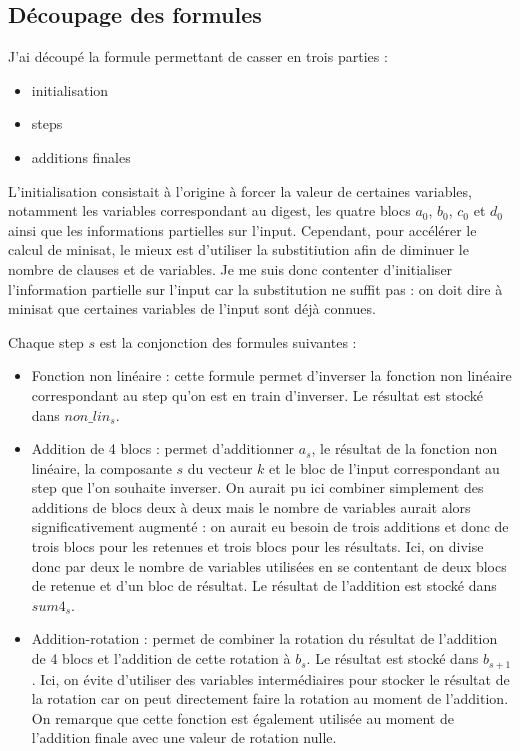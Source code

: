 \documentclass{article}
\begin{document}
\subsection{Découpage des formules}
J'ai découpé la formule permettant de casser en trois parties : 
\begin{itemize}
\item initialisation
\item steps
\item additions finales
\end{itemize}
 
L'initialisation consistait à l'origine à forcer la valeur de certaines variables, notamment les variables correspondant au digest, les quatre blocs $a_0$, $b_0$, $c_0$ et $d_0$ ainsi que les informations partielles sur l'input. Cependant, pour accélérer le calcul de minisat, le mieux est d'utiliser la substitiution afin de diminuer le nombre de clauses et de variables. Je me suis donc contenter d'initialiser l'information partielle sur l'input car la substitution ne suffit pas : on doit dire à minisat que certaines variables de l'input sont déjà connues.
\par
Chaque step $s$ est la conjonction des formules suivantes : 
\begin{itemize}
  \item Fonction non linéaire : cette formule permet d'inverser la fonction non linéaire correspondant au step qu'on est en train d'inverser. Le résultat est stocké dans $non\_lin_s$.
  \item Addition de 4 blocs : permet d'additionner $a_s$, le résultat de la fonction non linéaire, la composante $s$ du vecteur $k$ et le bloc de l'input correspondant au step que l'on souhaite inverser. On aurait pu ici combiner simplement des additions de blocs deux à deux mais le nombre de variables aurait alors significativement augmenté : on aurait eu besoin de trois additions et donc de trois blocs pour les retenues et trois blocs pour les résultats. Ici, on divise donc par deux le nombre de variables utilisées en se contentant de deux blocs de retenue et d'un bloc de résultat. Le résultat de l'addition est stocké dans $sum4_s$.
  \item Addition-rotation : permet de combiner la rotation du résultat de l'addition de 4 blocs et l'addition de cette rotation à $b_s$. Le résultat est stocké dans $b_{s+1}$. Ici, on évite d'utiliser des variables intermédiaires pour stocker le résultat de la rotation car on peut directement faire la rotation au moment de l'addition. On remarque que cette fonction est également utilisée au moment de l'addition finale avec une valeur de rotation nulle.
\end{itemize}
\end{document}
